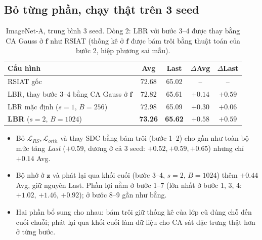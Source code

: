 \documentclass[11pt]{article}
\newcommand{\vf}{\mathbf{f}}
\newcommand{\vz}{\mathbf{z}}
\begin{document}
\subsection{Bỏ từng phần, chạy thật trên 3 seed}
\begin{table}[H]
\centering\small
\caption{ImageNet-A, trung bình 3 seed. Dòng 2: LBR với bước 3--4 được thay bằng CA Gauss ở $\vf$ như RSIAT (thống kê ở
$\vf$ được bám trôi bằng thuật toán của bước 2, hiệp phương sai mẫu).}
\label{tab:abl3}
\begin{tabular}{lcccc}
\toprule
Cấu hình & Avg & Last & $\Delta$Avg & $\Delta$Last\\
\midrule
RSIAT gốc & 72.68 & 65.02 & -- & --\\
LBR, thay bước 3--4 bằng CA Gauss ở $\vf$ & 72.82 & 65.61 & $+0.14$ & $+0.59$\\
LBR mặc định ($s{=}1$, $B{=}256$) & 72.98 & 65.09 & $+0.30$ & $+0.06$\\
\textbf{LBR} ($s{=}2$, $B{=}1024$) & \textbf{73.26} & \textbf{65.62} & $\mathbf{+0.58}$ & $\mathbf{+0.59}$\\
\bottomrule
\end{tabular}
\end{table}
\begin{itemize}
\item Bỏ $\mathcal L_{RS},\mathcal L_{orth}$ và thay SDC bằng bám trôi (bước 1--2) cho gần như toàn bộ mức tăng
      \emph{Last} ($+0.59$, dương ở cả 3 seed: $+0.52, +0.59, +0.65$) nhưng chỉ $+0.14$ Avg.
\item Bộ nhớ ở $\vz$ và phát lại qua khối cuối (bước 3--4, $s{=}2$, $B{=}1024$) thêm $+0.44$ Avg, giữ nguyên Last. Phần
      lợi nằm ở bước 1--7 (lớn nhất ở bước 1, 3, 4: $+1.02$, $+1.46$, $+0.92$); ở bước 8--9 gần như bằng.
\item Hai phần bổ sung cho nhau: bám trôi giữ thống kê của lớp cũ đúng chỗ đến cuối chuỗi; phát lại qua khối cuối làm dữ
      liệu cho CA sát đặc trưng thật hơn ở từng bước.
\end{itemize}
\end{document}
